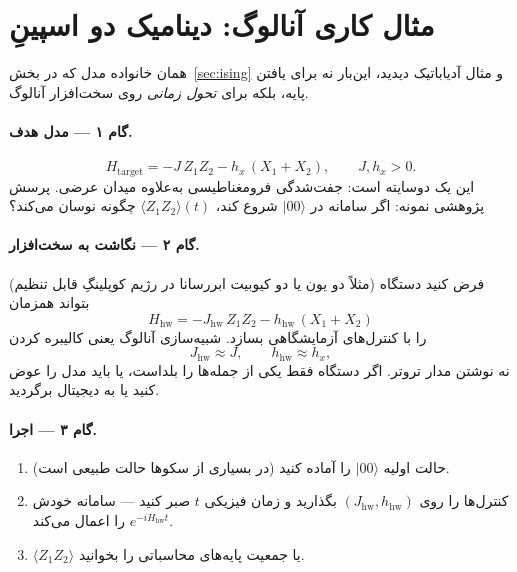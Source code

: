 \section{مثال کاری آنالوگ: دینامیک دو اسپینِ }
\label{sec:analog-example}

همان خانواده مدل که در بخش~\ref{sec:ising} و مثال آدیاباتیک دیدید، این‌بار نه برای یافتن پایه، بلکه برای \emph{تحول زمانی} روی سخت‌افزار آنالوگ.

\paragraph{گام ۱ --- مدل هدف.}
\begin{equation}
	\label{eq:analog-tfim}
	H_{\mathrm{target}}
	=
	-J\, Z_1 Z_2
	-
	h_x\,(X_1+X_2),
	\qquad
	J,h_x>0.
\end{equation}
این یک  دوسایته است: جفت‌شدگی فرومغناطیسی به‌علاوه میدان عرضی. پرسش پژوهشی نمونه: اگر سامانه در $\lvert00\rangle$ شروع کند، $\langle Z_1 Z_2\rangle(t)$ چگونه نوسان می‌کند؟

\paragraph{گام ۲ --- نگاشت به سخت‌افزار.}
فرض کنید دستگاه (مثلاً دو یون یا دو کیوبیت ابررسانا در رژیم کوپلینگِ قابل تنظیم) بتواند همزمان
\begin{equation}
	H_{\mathrm{hw}}
	=
	-J_{\mathrm{hw}}\, Z_1 Z_2
	-
	h_{\mathrm{hw}}\,(X_1+X_2)
\end{equation}
را با کنترل‌های آزمایشگاهی بسازد. شبیه‌سازی آنالوگ یعنی کالیبره کردن
\begin{equation}
	J_{\mathrm{hw}}\approx J,
	\qquad
	h_{\mathrm{hw}}\approx h_x,
\end{equation}
نه نوشتن مدار تروتر. اگر دستگاه فقط یکی از جمله‌ها را بلداست، یا باید مدل را عوض کنید یا به دیجیتال برگردید.

\paragraph{گام ۳ --- اجرا.}
\begin{enumerate}
	\item حالت اولیه $\lvert00\rangle$ را آماده کنید (در بسیاری از سکوها حالت طبیعی است).
	\item کنترل‌ها را روی $(J_{\mathrm{hw}},h_{\mathrm{hw}})$ بگذارید و زمان فیزیکی $t$ صبر کنید --- سامانه خودش $e^{-iH_{\mathrm{hw}}t}$ را اعمال می‌کند.
	\item $\langle Z_1 Z_2\rangle$ یا جمعیت پایه‌های محاسباتی را بخوانید.
\end{enumerate}

